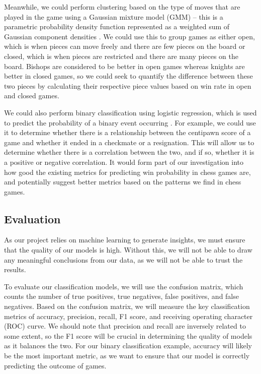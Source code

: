 \documentclass[%
 superscriptaddress,
showpacs,preprintnumbers,
 amsmath,
 amssymb,
 aps,
 pra,
showkeys,
onecolumn,
notitlepage,
11pt,
tightenlines      %
]{revtex4-1}
\begin{document}
Meanwhile, we could perform clustering based on the type of moves that are played in the game using a Gaussian mixture model (GMM) -- this is a parametric probability density function represented as a weighted sum of Gaussian component densities \cite{reynolds2009gaussian}. We could use this to group games as either open, which is when pieces can move freely and there are few pieces on the board or closed, which is when pieces are restricted and there are many pieces on the board. Bishops are considered to be better in open games whereas knights are better in closed games, so we could seek to quantify the difference between these two pieces by calculating their respective piece values based on win rate in open and closed games.

We could also perform binary classification using logistic regression, which is used to predict the probability of a binary event occurring \cite{peng2002introduction}. For example, we could use it to determine whether there is a relationship between the centipawn score of a game and whether it ended in a checkmate or a resignation. This will allow us to determine whether there is a correlation between the two, and if so, whether it is a positive or negative correlation. It would form part of our investigation into how good the existing metrics for predicting win probability in chess games are, and potentially suggest better metrics based on the patterns we find in chess games.

\subsection{Evaluation}
As our project relies on machine learning to generate insights, we must ensure that the quality of our models is high. Without this, we will not be able to draw any meaningful conclusions from our data, as we will not be able to trust the results.

To evaluate our classification models, we will use the confusion matrix, which counts the number of true positives, true negatives, false positives, and false negatives. Based on the confusion matrix, we will measure the key classification metrics of accuracy, precision, recall, F1 score, and receiving operating character (ROC) curve. We should note that precision and recall are inversely related to some extent, so the F1 score will be crucial in determining the quality of models as it balances the two. For our binary classification example, accuracy will likely be the most important metric, as we want to ensure that our model is correctly predicting the outcome of games.
\end{document}
